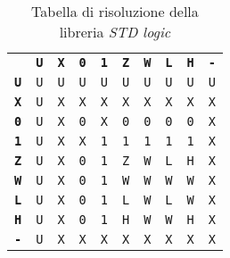 \documentclass{article}
\begin{document}
\begin{table}[htbp]
  \bigskip
  \centering
  \begin{tabular}{cccccccccc}                                                                                                                                                                                                              \\
                        & \textbf{\texttt{U}} & \textbf{\texttt{X}} & \textbf{\texttt{0}} & \textbf{\texttt{1}} & \textbf{\texttt{Z}} & \textbf{\texttt{W}} & \textbf{\texttt{L}} & \textbf{\texttt{H}} & \textbf{\texttt{-}} \\
    \textbf{\texttt{U}} & \texttt{U}          & \texttt{U}          & \texttt{U}          & \texttt{U}          & \texttt{U}          & \texttt{U}          & \texttt{U}          & \texttt{U}          & \texttt{U}          \\
    \textbf{\texttt{X}} & \texttt{U}          & \texttt{X}          & \texttt{X}          & \texttt{X}          & \texttt{X}          & \texttt{X}          & \texttt{X}          & \texttt{X}          & \texttt{X}          \\
    \textbf{\texttt{0}} & \texttt{U}          & \texttt{X}          & \texttt{0}          & \texttt{X}          & \texttt{0}          & \texttt{0}          & \texttt{0}          & \texttt{0}          & \texttt{X}          \\
    \textbf{\texttt{1}} & \texttt{U}          & \texttt{X}          & \texttt{X}          & \texttt{1}          & \texttt{1}          & \texttt{1}          & \texttt{1}          & \texttt{1}          & \texttt{X}          \\
    \textbf{\texttt{Z}} & \texttt{U}          & \texttt{X}          & \texttt{0}          & \texttt{1}          & \texttt{Z}          & \texttt{W}          & \texttt{L}          & \texttt{H}          & \texttt{X}          \\
    \textbf{\texttt{W}} & \texttt{U}          & \texttt{X}          & \texttt{0}          & \texttt{1}          & \texttt{W}          & \texttt{W}          & \texttt{W}          & \texttt{W}          & \texttt{X}          \\
    \textbf{\texttt{L}} & \texttt{U}          & \texttt{X}          & \texttt{0}          & \texttt{1}          & \texttt{L}          & \texttt{W}          & \texttt{L}          & \texttt{W}          & \texttt{X}          \\
    \textbf{\texttt{H}} & \texttt{U}          & \texttt{X}          & \texttt{0}          & \texttt{1}          & \texttt{H}          & \texttt{W}          & \texttt{W}          & \texttt{H}          & \texttt{X}          \\
    \textbf{\texttt{-}} & \texttt{U}          & \texttt{X}          & \texttt{X}          & \texttt{X}          & \texttt{X}          & \texttt{X}          & \texttt{X}          & \texttt{X}          & \texttt{X}
  \end{tabular}
  \caption{Tabella di risoluzione della libreria \textit{STD logic}}
  \label{tab:tabella-risoluzione-std-logic}
  \bigskip
\end{table}
\end{document}
